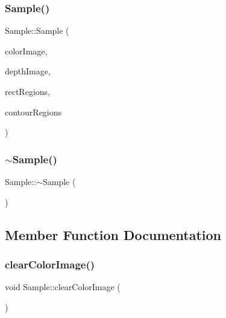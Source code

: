 \mbox{\label{struct_sample_a40041d82410fa312c6b1fa9f2ebb577b}} 
\subsubsection{\texorpdfstring{Sample()}{Sample()}\hspace{0.1cm}{\footnotesize\ttfamily [9/9]}}
{\footnotesize\ttfamily Sample\+::\+Sample (\begin{DoxyParamCaption}\item[{const cv\+::\+Mat \&}]{color\+Image,  }\item[{const cv\+::\+Mat \&}]{depth\+Image,  }\item[{const \hyperlink{_rect_regions_8h_af395a1050a923eecf6862568feaf5d1d}{Rect\+Regions\+Ptr} \&}]{rect\+Regions,  }\item[{const \hyperlink{_contour_regions_8h_a3a7590ecfb061e3c09270d38b53671ef}{Contour\+Regions\+Ptr} \&}]{contour\+Regions }\end{DoxyParamCaption})}

\mbox{\label{struct_sample_aea8a48c34d94596f6affbbd28938fb2c}} 
\subsubsection{\texorpdfstring{$\sim$\+Sample()}{~Sample()}}
{\footnotesize\ttfamily Sample\+::$\sim$\+Sample (\begin{DoxyParamCaption}{ }\end{DoxyParamCaption})}



\subsection{Member Function Documentation}
\mbox{\label{struct_sample_a54f7617fddaaa461fd46320e5bb19201}} 
\subsubsection{\texorpdfstring{clear\+Color\+Image()}{clearColorImage()}}
{\footnotesize\ttfamily void Sample\+::clear\+Color\+Image (\begin{DoxyParamCaption}{ }\end{DoxyParamCaption})}

